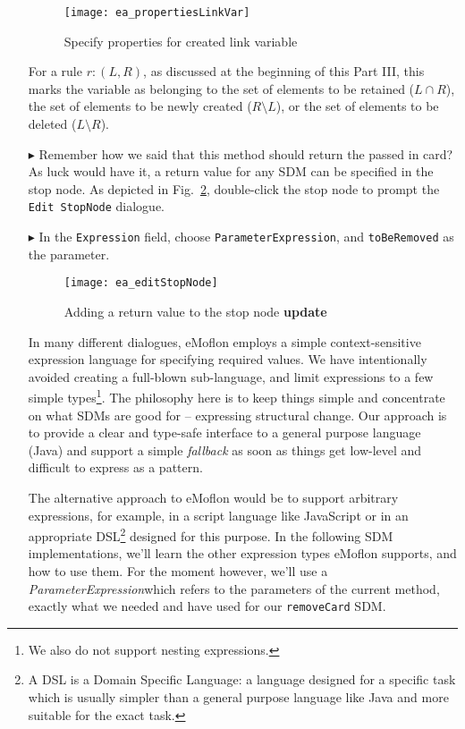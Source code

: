\begin{itemize}
\begin{figure}[htp]
\begin{center} 
 \texttt{[image: ea\_propertiesLinkVar]}
  \caption{Specify properties for created link variable}  
  \label{fig:link_variable_properties}
\end{center}
\end{figure}

For a rule $r: (L, R)$, as discussed at the beginning of this Part III, this marks the variable as belonging to the set of elements to be retained ($L\cap R$), the
set of elements to be newly created ($R\setminus L$), or the set of elements to be deleted ($L\setminus R$).

\item[$\blacktriangleright$] Remember how we said that this method should return the passed in card? As luck would have it, a return value for any SDM can be
specified in the stop node. As depicted in Fig.~\ref{fig:stop_node_return_value}, double-click the stop node to prompt the \texttt{Edit StopNode} dialogue. 

\item[$\blacktriangleright$] In the \texttt{Expression} field, choose \texttt{ParameterExpression}, and \texttt{toBeRemoved} as the parameter.

\begin{figure}[htp]
\begin{center}
  \texttt{[image: ea\_editStopNode]}
  \caption{Adding a return value to the stop node {\bf update}}  
  \label{fig:stop_node_return_value}
\end{center}
\end{figure}

In many different dialogues, eMoflon employs a simple context-sensitive expression language for specifying required values. We have intentionally
avoided creating a full-blown sub-language, and limit expressions to a few simple types\footnote{We also do not support nesting expressions.}. The philosophy here
is to keep things simple and concentrate on what SDMs are good for -- expressing structural change. Our approach is to provide a clear and type-safe interface
to a general purpose language (Java) and support a simple \emph{fallback} as soon as things get low-level and difficult to express as a pattern.

The alternative approach to eMoflon would be to support arbitrary expressions, for example, in a script language like JavaScript or in an appropriate
DSL\footnote{A DSL is a Domain Specific Language: a language designed for a specific task which is usually simpler than a general purpose language like Java and
more suitable for the exact task.} designed for this purpose. In the following SDM implementations, we'll learn the other expression types eMoflon supports,
and how to use them. For the moment however, we'll use a \emph{ParameterExpression}which refers to the parameters of the current
method, exactly what we needed and have used for our \texttt{removeCard} SDM.


\end{itemize}
